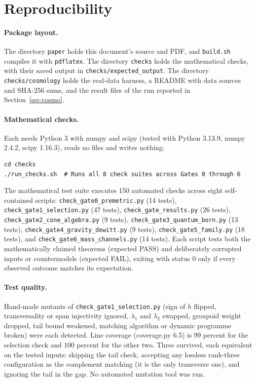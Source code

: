 \documentclass[11pt]{article}
\theoremstyle{definition}
\theoremstyle{remark}
\begin{document}
\appendix
\section{Reproducibility}
\label{app:repro}
\small\sloppy

\paragraph{Package layout.} The directory \texttt{paper} holds this document's source
and PDF, and \texttt{build.sh} compiles it with \texttt{pdflatex}. The directory
\texttt{checks} holds the mathematical checks, with their saved output in
\texttt{checks/expected\_output}. The directory \texttt{checks/cosmology} holds the
real-data harness, a README with data sources and SHA-256 sums, and the result files of
the run reported in Section~\ref{sec:cosmo}.

\paragraph{Mathematical checks.} Each needs Python 3 with numpy and scipy (tested with
Python 3.13.9, numpy 2.4.2, scipy 1.16.3), reads no files and writes nothing:
\begin{verbatim}
cd checks
./run_checks.sh  # Runs all 8 check suites across Gates 0 through 6
\end{verbatim}
The mathematical test suite executes 150 automated checks across eight self-contained scripts:
\texttt{check\_gate0\_premetric.py} (14 tests),
\texttt{check\_gate1\_selection.py} (47 tests),
\texttt{check\_gate\_results.py} (26 tests),
\texttt{check\_gate2\_cone\_algebra.py} (9 tests),
\texttt{check\_gate3\_quantum\_born.py} (13 tests),
\texttt{check\_gate4\_gravity\_dewitt.py} (9 tests),
\texttt{check\_gate5\_family.py} (18 tests), and
\texttt{check\_gate6\_mass\_channels.py} (14 tests).
Each script tests both the mathematically claimed theorems (expected PASS) and deliberately
corrupted inputs or countermodels (expected FAIL), exiting with status 0 only if every
observed outcome matches its expectation.

\paragraph{Test quality.} Hand-made mutants of \texttt{check\_gate1\_selection.py}
(sign of $h$ flipped, transversality or span injectivity ignored, $\lambda_1$ and
$\lambda_2$ swapped, groupoid weight dropped, tail bound weakened, matching algorithm or
dynamic programme broken) were each detected. Line coverage (coverage.py 6.5) is
99 percent for the selection check and 100 percent for the other two. Three survived, each equivalent on the
tested inputs: skipping the tail check, accepting any lossless rank-three configuration
as the complement matching (it is the only transverse one), and ignoring the tail in the
gap. No automated mutation tool was run.
\end{document}
